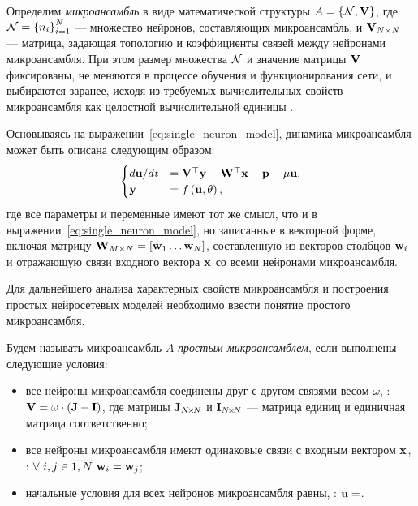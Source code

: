 
\begin{Definition*}
    Определим \textit{микроансамбль} в виде математической структуры $A = \left\{ \mathcal{N}, \mathrm{\mathbf{V}} \right\}$, где $\mathcal{N} = \left\{ n_{i} \right\}_{i=1}^{N} $ --- множество нейронов, составляющих микроансамбль, и $\mathrm{\mathbf{V}}_{N \times N}$ --- матрица, задающая топологию и коэффициенты связей между нейронами микроансамбля. При этом размер множества $\mathcal{N}$ и значение матрицы $\mathrm{\mathbf{V}}$ фиксированы, \ie не меняются в процессе обучения и функционирования сети, и выбираются заранее, исходя из требуемых вычислительных свойств микроансамбля как целостной вычислительной единицы .
\end{Definition*}

Основываясь на выражении~\eqref{eq:single_neuron_model}, динамика микроансамбля может быть описана следующим образом:
\begin{equation}
    \label{eq:microensemble_model}
    \begin{cases}
        d\mathrm{\mathbf{u}}/d\mathit{t} &= \mathrm{\mathbf{V}}^{\top} \mathrm{\mathbf{y}} + \mathrm{\mathbf{W}}^{\top} \mathrm{\mathbf{x}} - \mathrm{\mathbf{p}} - \mu \mathrm{\mathbf{u}}, \\
        \mathrm{\mathbf{y}}              &= f\left( \mathrm{\mathbf{u}}, \theta \right), \\
    \end{cases}
\end{equation}
где все параметры и переменные имеют тот же смысл, что и в выражении~\eqref{eq:single_neuron_model}, но записанные в векторной форме, включая матрицу $\mathrm{\mathbf{W}}_{M \times N} = \left[ \mathrm{\mathbf{w}}_{1} \ldots \mathrm{\mathbf{w}}_{N} \right]$, составленную из векторов-столбцов $\mathrm{\mathbf{w}}_{i}$ и отражающую связи входного вектора $\mathrm{\mathbf{x}}$ со всеми нейронами микроансамбля.

Для дальнейшего анализа характерных свойств микроансамбля и построения простых нейросетевых моделей необходимо ввести понятие простого микроансамбля.
\begin{Definition*}
    Будем называть микроансамбль $A$ \textit{простым микроансамблем}, если выполнены следующие условия:
    \begin{itemize}
        \item все нейроны микроансамбля соединены друг с другом связями весом $\omega$, \ie: $\mathrm{\mathbf{V}} = \omega \cdot \left( \mathrm{\mathbf{J}} - \mathrm{\mathbf{I}} \right)$, где матрицы $\mathrm{\mathbf{J}}_{N\!\times\!N}$ и $\mathrm{\mathbf{I}}_{N\!\times\!N}$  --- матрица единиц и единичная матрица соответственно;
        \item все нейроны микроансамбля имеют одинаковые связи с входным вектором $\mathrm{\mathbf{x}}$, \ie: $\forall\ i,j \in \overline{1,N}\ \mathrm{\mathbf{w}}_{i} = \mathrm{\mathbf{w}}_{j}$;
        \item начальные условия для всех нейронов микроансамбля равны, \ie: $\mathrm{\mathbf{u}} = $.
    \end{itemize}
\end{Definition*}

